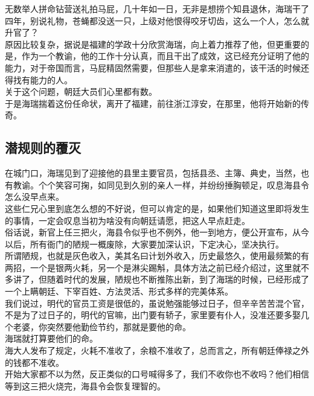 \begin{multicols}{\theparacolNo}
无数举人拼命钻营送礼拍马屁，几十年如一日，无非是想捞个知县退休，海瑞干了四年，别说礼物，苍蝇都没送一只，上级对他恨得咬牙切齿，这么一个人，怎么就升官了？\\

原因比较复杂，据说是福建的学政十分欣赏海瑞，向上着力推荐了他，但更重要的是，作为一个教谕，他的工作十分认真，而且干出了成效，这已经充分证明了他的能力，对于帝国而言，马屁精固然需要，但那些人是拿来消遣的，该干活的时候还得找有能力的人。\\

关于这个问题，朝廷大员们心里都有数。\\

于是海瑞揣着这份任命状，离开了福建，前往浙江淳安，在那里，他将开始新的传奇。\\

\subsection{潜规则的覆灭}
在城门口，海瑞见到了迎接他的县里主要官员，包括县丞、主簿、典史，当然，也有教谕。个个笑容可掬，如同见到久别的亲人一样，并纷纷捶胸顿足，叹息海县令怎么没早点来。\\

这些仁兄心里到底怎么想的不好说，但可以肯定的是，如果他们知道这里即将发生的事情，一定会叹息当初为啥没有向朝廷请愿，把这人早点赶走。\\

俗话说，新官上任三把火，海县令似乎也不例外，他一到地方，便公开宣布，从今以后，所有衙门的陋规一概废除，大家要加深认识，下定决心，坚决执行。\\

所谓陋规，也就是灰色收入，美其名曰计划外收入，历史最悠久，使用最频繁的有两招，一个是银两火耗，另一个是淋尖踢斛，具体方法之前已经介绍过，这里就不多讲了，但随着时代的发展，陋规也不断推陈出新，到了海瑞的时候，已经形成了一个上瞒朝廷、下宰百姓、方法灵活、形式多样的完美体系。\\

我们说过，明代的官员工资是很低的，虽说勉强能够过日子，但辛辛苦苦混个官，不是为了过日子的，明代的官嘛，出门要有轿子，家里要有仆人，没准还要多娶几个老婆，你突然要他勤俭节约，那就是要他的命。\\

海瑞就打算要他们的命。\\

海大人发布了规定，火耗不准收了，余粮不准收了，总而言之，所有朝廷俸禄之外的钱都不准收。\\

开始大家都不以为然，反正类似的口号喊得多了，我们不收你也不收吗？他们相信等到这三把火烧完，海县令会恢复理智的。\\


\end{multicols}
